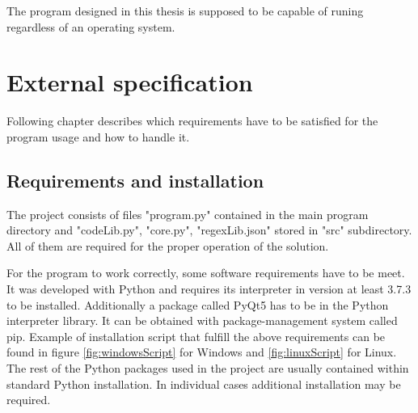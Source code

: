 \documentclass[a4paper,twoside,12pt]{book}
\begin{document}
The program designed in this thesis is supposed to be capable of runing regardless of an operating system.



\chapter{External specification}

Following chapter describes which requirements have to be satisfied for the program usage and how to handle it.

\section{Requirements and installation}

The project consists of files "program.py" contained in the main program directory and
"codeLib.py", "core.py", "regexLib.json" stored in "src" subdirectory. All of them are 
required for the proper operation of the solution.

For the program to work correctly, some software requirements have to be meet. It was developed with 
Python and requires its interpreter in version at least 3.7.3 to be installed. Additionally a package called PyQt5 has 
to be in the Python interpreter library. It can be obtained with package-management 
system called pip. Example of installation script that fulfill the above requirements can be found
in figure \ref{fig:windowsScript} for Windows and \ref{fig:linuxScript} for Linux.
The rest of the Python packages used in the project are usually contained within standard Python installation.
In individual cases additional installation may be required.
\end{document}
